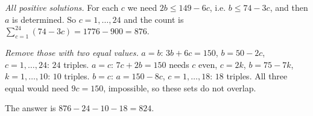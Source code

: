\emph{All positive solutions.} For each $c$ we need $2b\le149-6c$, i.e. $b\le74-3c$, and then $a$ is determined. So $c=1,\dots,24$ and the count is $\sum_{c=1}^{24}(74-3c)=1776-900=876$.

\emph{Remove those with two equal values.} $a=b$: $3b+6c=150$, $b=50-2c$, $c=1,\dots,24$: $24$ triples. $a=c$: $7c+2b=150$ needs $c$ even, $c=2k$, $b=75-7k$, $k=1,\dots,10$: $10$ triples. $b=c$: $a=150-8c$, $c=1,\dots,18$: $18$ triples. All three equal would need $9c=150$, impossible, so these sets do not overlap.

The answer is $876-24-10-18=\boxed{824}$.
